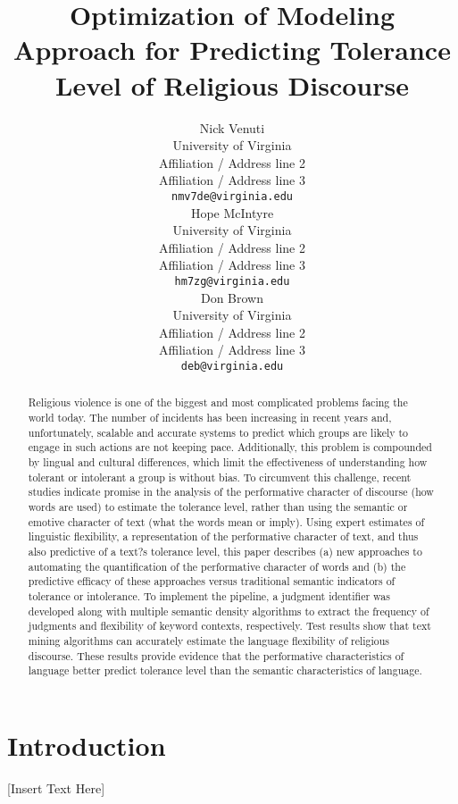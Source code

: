 \documentclass[11pt]{article}
\title{Optimization of Modeling Approach for Predicting Tolerance Level of Religious Discourse}
\author{Nick Venuti \\
  University of Virginia \\
  Affiliation / Address line 2 \\
  Affiliation / Address line 3 \\
  {\tt nmv7de@virginia.edu} \\\And
  Hope McIntyre \\
  University of Virginia \\
  Affiliation / Address line 2 \\
  Affiliation / Address line 3 \\
  {\tt hm7zg@virginia.edu} \\\And
  Don Brown \\
  University of Virginia \\
  Affiliation / Address line 2 \\
  Affiliation / Address line 3 \\
  {\tt deb@virginia.edu} \\}
\date{}
\begin{document}
\maketitle
\begin{abstract}

Religious violence is one of the biggest and most complicated problems facing the world today. The number of incidents has been increasing in recent years and, unfortunately, scalable and accurate systems to predict which groups are likely to engage in such actions are not keeping pace. Additionally, this problem is compounded by lingual and cultural differences, which limit the effectiveness of understanding how tolerant or intolerant a group is without bias. To circumvent this challenge, recent studies indicate promise in the analysis of the performative character of discourse (how words are used) to estimate the tolerance level, rather than using the semantic or emotive character of text (what the words mean or imply). Using expert estimates of linguistic flexibility, a representation of the performative character of text, and thus also predictive of a text?s tolerance level, this paper describes (a) new approaches to automating the quantification of the performative character of words and (b) the predictive efficacy of these approaches versus traditional semantic indicators of tolerance or intolerance. To implement the pipeline, a judgment identifier was developed along with multiple semantic density algorithms to extract the frequency of judgments and flexibility of keyword contexts, respectively. Test results show that text mining algorithms can accurately estimate the language flexibility of religious discourse. These results provide evidence that the performative characteristics of language better predict tolerance level than the semantic characteristics of language.

\end{abstract}

\section{Introduction}
\label{intro}

[Insert Text Here]
\end{document}
